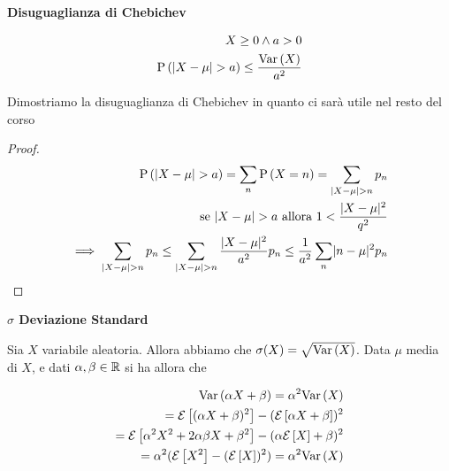 \begin{defn}
	\textbf{Disuguaglianza di Chebichev}
	
	\begin{equation*}
		\begin{aligned}
			X \geq 0 \land a > 0 \\
			\text{P}\left(\lvert X - \mu\rvert > a\right) \leq \dfrac{\text{Var}\left(X\right)}{a^2}
		\end{aligned}
	\end{equation*}
	
	Dimostriamo la disuguaglianza di Chebichev in quanto ci sarà utile nel resto del corso
	
	\begin{proof}
		\begin{equation*}
			\begin{aligned}
				\text{P}\left(\lvert X - \mu\rvert > a\right) = \sum_n \text{P}\left(X = n\right) = \sum_{\lvert X - \mu\rvert > n} p_n \\
				\text{se } \lvert X - \mu\rvert > a \text{ allora } 1 < \dfrac{\lvert X - \mu\rvert^2}{q^2} \\ \implies  \sum_{\lvert X - \mu\rvert > n} p_n  \leq \sum_{\lvert X - \mu\rvert > n} \dfrac{\lvert X - \mu\rvert^2}{a^2} p_n \leq \dfrac{1}{a^2} \sum_n \lvert n - \mu\rvert^2 p_n 
			\end{aligned}
		\end{equation*}
	\end{proof}
\end{defn}


\begin{defn}
	\textbf{$\sigma$ Deviazione Standard}
	
	Sia $ X $ variabile aleatoria. Allora abbiamo che $ \sigma(X) = \sqrt{\text{Var}\left(X\right)} $. Data $ \mu $ media di $ X $, e dati $ \alpha, \beta \in \mathbb{R} $ si ha allora che
	
	\begin{equation*}
		\begin{aligned}
			\text{Var}\left(\alpha X + \beta\right) = \alpha ^2 \text{Var}\left(X\right) \\
			= \mathcal{E}\left[(\alpha X + \beta)^2\right] - (\mathcal{E}\left[\alpha X + \beta\right])^2 \\
			= \mathcal{E}\left[\alpha^2 X^2 + 2 \alpha \beta X + \beta^2\right] - (\alpha \mathcal{E}\left[X\right] + \beta)^2 \\
			= \alpha^2 (\mathcal{E}\left[X^2\right] - (\mathcal{E}\left[X\right])^2) = \alpha^2 \text{Var}\left(X\right)
		\end{aligned}
	\end{equation*}
\end{defn}


